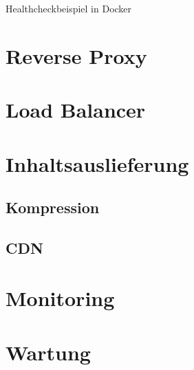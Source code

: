 \begin{listing}
    \label{lst:healthcheck}
    \inputminted{sh}{snippets/sh/healthcheck.sh}
    \caption{Healthcheckbeispiel in Docker}
\end{listing}

\section{Reverse Proxy}

\section{Load Balancer}

\section{Inhaltsauslieferung}

\subsection{Kompression}
\subsection{CDN}

\section{Monitoring}

\section{Wartung}

